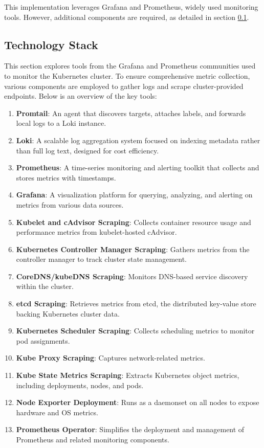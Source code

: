 This implementation leverages Grafana and Prometheus, widely used monitoring tools. However, additional components are required, as detailed in section \ref{sec:technology_stack}.

\subsection{Technology Stack}\label{sec:technology_stack}
This section explores tools from the Grafana and Prometheus communities used to monitor the Kubernetes cluster. To ensure comprehensive metric collection, various components are employed to gather logs and scrape cluster-provided endpoints. Below is an overview of the key tools:

\begin{enumerate}
    \item \textbf{Promtail}: An agent that discovers targets, attaches labels, and forwards local logs to a Loki instance.
    \item \textbf{Loki}: A scalable log aggregation system focused on indexing metadata rather than full log text, designed for cost efficiency.
    \item \textbf{Prometheus}: A time-series monitoring and alerting toolkit that collects and stores metrics with timestamps.
    \item \textbf{Grafana}: A visualization platform for querying, analyzing, and alerting on metrics from various data sources.
    \item \textbf{Kubelet and cAdvisor Scraping}: Collects container resource usage and performance metrics from kubelet-hosted cAdvisor.
    \item \textbf{Kubernetes Controller Manager Scraping}: Gathers metrics from the controller manager to track cluster state management.
    \item \textbf{CoreDNS/kubeDNS Scraping}: Monitors DNS-based service discovery within the cluster.
    \item \textbf{etcd Scraping}: Retrieves metrics from etcd, the distributed key-value store backing Kubernetes cluster data.
    \item \textbf{Kubernetes Scheduler Scraping}: Collects scheduling metrics to monitor pod assignments.
    \item \textbf{Kube Proxy Scraping}: Captures network-related metrics.
    \item \textbf{Kube State Metrics Scraping}: Extracts Kubernetes object metrics, including deployments, nodes, and pods.
    \item \textbf{Node Exporter Deployment}: Runs as a daemonset on all nodes to expose hardware and OS metrics.
    \item \textbf{Prometheus Operator}: Simplifies the deployment and management of Prometheus and related monitoring components.
\end{enumerate}

